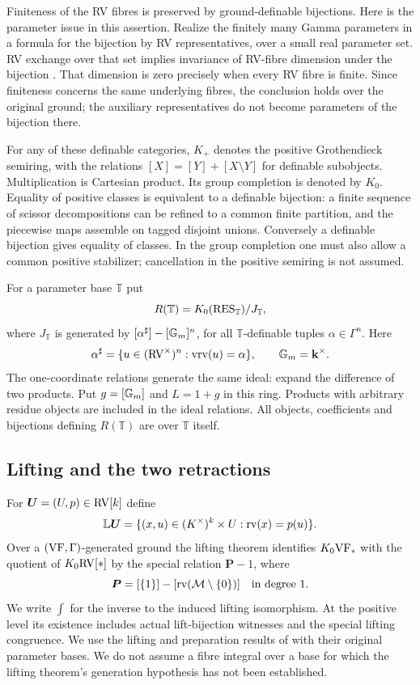 Finiteness of the RV fibres is preserved by ground-definable bijections.
Here is the parameter issue in this assertion. Realize the finitely many
Gamma parameters in a formula for the bijection by RV representatives,
over a small real parameter set. RV exchange over that set implies
invariance of RV-fibre dimension under the bijection
\cite[Lemma 4.13]{YinST}. That dimension is zero precisely when every
RV fibre is finite. Since finiteness concerns the same underlying fibres,
the conclusion holds over the original ground; the auxiliary
representatives do not become parameters of the bijection there.

For any of these definable categories, $K_+$ denotes the positive
Grothendieck semiring, with the relations
$[X]=[Y]+[X\setminus Y]$ for definable subobjects. Multiplication is
Cartesian product. Its group completion is denoted by $K_0$.
Equality of positive classes is equivalent to a definable bijection:
a finite sequence of scissor decompositions can be refined to a common
finite partition, and the piecewise maps assemble on tagged disjoint
unions. Conversely a definable bijection gives equality of classes.
In the group completion one must also allow a common positive
stabilizer; cancellation in the positive semiring is not assumed.

For a parameter base $\mathbb T$ put
\[
 R(\mathbb T)=K_0(\mathrm{RES}_{\mathbb T})/J_{\mathbb T},
\]
where $J_{\mathbb T}$ is generated by
$[\alpha^\sharp]-[\mathbb G_m]^n$, for all $\mathbb T$-definable tuples
$\alpha\in\Gamma^n$. Here
\[
 \alpha^\sharp=\{u\in(\mathrm{RV}^\times)^n:\operatorname{vrv}(u)=\alpha\},
 \qquad \mathbb G_m=\mathbf k^\times.
\]
The one-coordinate relations generate the same ideal: expand the
difference of two products. Put $g=[\mathbb G_m]$ and $L=1+g$ in this ring.
Products with arbitrary residue objects are included in the ideal
relations. All objects, coefficients and bijections defining
$R(\mathbb T)$ are over $\mathbb T$ itself.

\subsection{Lifting and the two retractions}
For $\bm U=(U,p)\in\mathrm{RV}[k]$ define
\[
 \mathbb L\bm U=\{(x,u)\in(K^\times)^k\times U:\operatorname{rv}(x)=p(u)\}.
\]
Over a $(\mathrm{VF},\Gamma)$-generated ground the lifting theorem identifies
$K_0\mathrm{VF}_*$ with the quotient of $K_0\mathrm{RV}[*]$ by the special relation
$\bm P-1$, where
\[
 \bm P=[\{1\}]-[\operatorname{rv}(\mathcal M\setminus\{0\})]
       \quad\text{in degree }1.
\]
We write $\int$ for the inverse to the induced lifting isomorphism.
At the positive level its existence includes actual lift-bijection
witnesses and the special lifting congruence. We use the lifting and
preparation results of \cite{YinST,YinI} with their original parameter
bases. We do not assume a fibre integral over a base for which the
lifting theorem's generation hypothesis has not been established.

